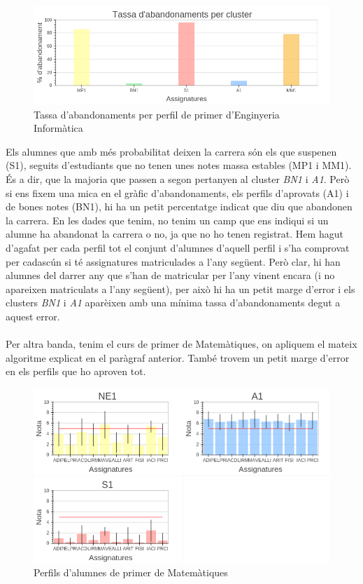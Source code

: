 \documentclass[12pt,a4paper,catalan]{article}
\begin{document}
\begin{figure}[h]
\centering
\includegraphics[width=\linewidth]{img/abandonaments_primer_info.png}
\caption{Tassa d'abandonaments per perfil de primer d'Enginyeria Informàtica}
\label{fig:abandonamentprimer}
\end{figure}

Els alumnes que amb més probabilitat deixen la carrera són els que suspenen (S1), seguits d'estudiants que no tenen unes notes massa estables (MP1 i MM1). És a dir, que la majoria que passen a segon pertanyen al cluster \textit{BN1} i \textit{A1}. Però si ens fixem una mica en el gràfic d'abandonaments, els perfils d'aprovats (A1) i de bones notes (BN1), hi ha un petit percentatge indicat que diu que abandonen la carrera. En les dades que tenim, no tenim un camp que ens indiqui si un alumne ha abandonat la carrera o no, ja que no ho tenen registrat. Hem hagut d'agafat per cada perfil tot el conjunt d'alumnes d'aquell perfil i s'ha comprovat per cadascún si té assignatures matriculades a l'any següent. Però clar, hi han alumnes del darrer any que s'han de matricular per l'any vinent encara (i no apareixen matriculats a l'any següent), per això hi ha un petit marge d'error i els clusters \textit{BN1} i \textit{A1} aparèixen amb una mínima tassa d'abandonaments degut a aquest error.
\\
\\
Per altra banda, tenim el curs de primer de Matemàtiques, on apliquem el mateix algoritme explicat en el paràgraf anterior. També trovem un petit marge d'error en els perfils que ho aproven tot.

\begin{figure}[h]
\centering
\includegraphics[width=\linewidth]{img/perfils_primer_mates.png}
\caption{Perfils d'alumnes de primer de Matemàtiques}
\end{figure}
\end{document}
